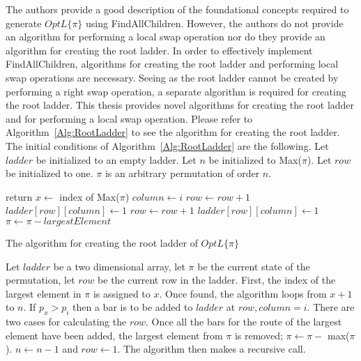 The authors provide a good description of the foundational concepts required to 
generate $OptL\{\pi\}$ using {\sc FindAllChildren}. However, the authors do not provide 
an algorithm for performing a local swap operation nor do they provide an algorithm for creating the root ladder.
In order to effectively implement {\sc FindAllChildren}, algorithms for creating the root ladder and performing 
local swap operations are necessary.
Seeing as the root ladder cannot be created by performing a right swap operation, a separate 
algorithm is required for creating the root ladder. This thesis provides 
novel algorithms for creating the root ladder and for performing a local swap operation.
Please refer to Algorithm~\ref{Alg:RootLadder} to see the algorithm for creating 
the root ladder. The initial conditions of Algorithm~\ref{Alg:RootLadder} are the 
following. Let $ladder$ be initialized to an empty ladder. Let $n$ be initialized 
to {\sc Max($\pi$)}. Let $row$ be initialized to one. $\pi$ is an arbitrary permutation 
of order $n$.
\begin{algorithm}[!htp]
	\begin{algorithmic}[1]
				\State return
			\EndIf
			\State $x \gets$ index of {\sc Max($\pi$)}
					\State $column \gets i$
							\State $row \gets row+1$
						\EndWhile
						\State $ladder[row][column] \gets 1$
					\Else 
						\State $row \gets row+1$
						\State $ladder[row][column] \gets 1$
					\EndIf
				\EndIf
			\EndFor
			\State $\pi \gets \pi - largestElement$
		\EndFunction

	\end{algorithmic}
	\caption{The algorithm for creating the root ladder of $OptL\{\pi\}$}
	\label{Alg:RootLadder}
\end{algorithm}\pagebreak



Let $ladder$ be a two dimensional array, let $\pi$ be the current state of the permutation, let $row$ be the current row in the ladder. 
First, the index of the largest element in $\pi$ is assigned to $x$. 
Once found, the algorithm loops from $x+1$ to $n$. If $p_{x}>p_{i}$ then a bar is to be added to 
$ladder$ at $row,column=i$. There are two cases for calculating the $row$. 
Once all the bars for the route of the largest element have been added, the largest element from $\pi$ is removed; 
$\pi \gets \pi -$ {\sc max($\pi$)}. $n \gets n-1$ and $row \gets 1$. The algorithm then makes a recursive call.


